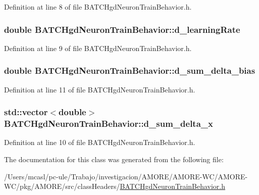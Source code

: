 Definition at line 8 of file BATCHgdNeuronTrainBehavior.h.

\hypertarget{class_b_a_t_c_hgd_neuron_train_behavior_a5abbdd1cacdd131657f8228740f7ed84}{
\subsubsection[{d\_\-learningRate}]{\setlength{\rightskip}{0pt plus 5cm}double {\bf BATCHgdNeuronTrainBehavior::d\_\-learningRate}}}
\label{class_b_a_t_c_hgd_neuron_train_behavior_a5abbdd1cacdd131657f8228740f7ed84}


Definition at line 9 of file BATCHgdNeuronTrainBehavior.h.

\hypertarget{class_b_a_t_c_hgd_neuron_train_behavior_a05667982d0be814e84f3bd58fd6b2d69}{
\subsubsection[{d\_\-sum\_\-delta\_\-bias}]{\setlength{\rightskip}{0pt plus 5cm}double {\bf BATCHgdNeuronTrainBehavior::d\_\-sum\_\-delta\_\-bias}}}
\label{class_b_a_t_c_hgd_neuron_train_behavior_a05667982d0be814e84f3bd58fd6b2d69}


Definition at line 11 of file BATCHgdNeuronTrainBehavior.h.

\hypertarget{class_b_a_t_c_hgd_neuron_train_behavior_acd99745752a709f6eb53ed16d1da2805}{
\subsubsection[{d\_\-sum\_\-delta\_\-x}]{\setlength{\rightskip}{0pt plus 5cm}std::vector$<$double$>$ {\bf BATCHgdNeuronTrainBehavior::d\_\-sum\_\-delta\_\-x}}}
\label{class_b_a_t_c_hgd_neuron_train_behavior_acd99745752a709f6eb53ed16d1da2805}


Definition at line 10 of file BATCHgdNeuronTrainBehavior.h.



The documentation for this class was generated from the following file:\begin{DoxyCompactItemize}
\item 
/Users/mcasl/pc-\/ule/Trabajo/investigacion/AMORE/AMORE-\/WC/AMORE-\/WC/pkg/AMORE/src/classHeaders/\hyperlink{_b_a_t_c_hgd_neuron_train_behavior_8h}{BATCHgdNeuronTrainBehavior.h}\end{DoxyCompactItemize}
